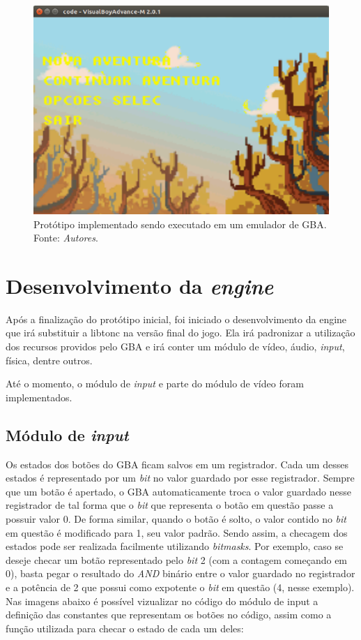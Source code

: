 \begin{figure}[H]
 \centering \includegraphics[keepaspectratio=true,scale=0.6]{figuras/tw-gba-1.eps}
   \caption{Protótipo implementado sendo executado em um emulador de GBA. Fonte: \textit{Autores}.}
   \label{tw-gba-1}
\end{figure}

\section{Desenvolvimento da \textit{engine}}

Após a finalização do protótipo inicial, foi iniciado o desenvolvimento da engine que irá substituir a libtonc na versão final do jogo. Ela irá padronizar a utilização dos recursos providos pelo GBA e irá conter um módulo de vídeo, áudio, \textit{input}, física, dentre outros.

Até o momento, o módulo de \textit{input} e parte do módulo de vídeo foram implementados.

\subsection{Módulo de \textit{input}}

Os estados dos botões do GBA ficam salvos em um registrador. Cada um desses estados é representado por um \textit{bit} no valor guardado por esse registrador. Sempre que um botão é apertado, o GBA automaticamente troca o valor guardado nesse registrador de tal forma que o \textit{bit} que representa o botão em questão passe a possuir valor 0. De forma similar, quando o botão é solto, o valor contido no \textit{bit} em questão é modificado para 1, seu valor padrão. Sendo assim, a checagem dos estados pode ser realizada facilmente utilizando \textit{bitmasks}. Por exemplo, caso se deseje checar um botão representado pelo \textit{bit} 2 (com a contagem começando em 0), basta pegar o resultado do \textit{AND} binário entre o valor guardado no registrador e a potência de 2 que possui como expotente o \textit{bit} em questão (4, nesse exemplo). Nas imagens abaixo é possível vizualizar no código do módulo de input a definição das constantes que representam os botões no código, assim como a função utilizada para checar o estado de cada um deles:

